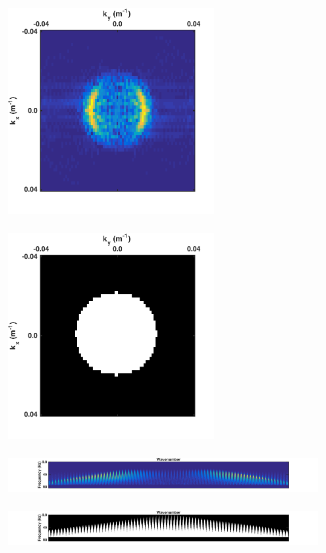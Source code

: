 \begin{figure}
	\centering
	\begin{subfigure}[t]{0.45\textwidth}
		\centering
		\includegraphics[width=0.6\textwidth]{Plots/FK-mask/FK-f_slice-data}
		\caption{}
		\label{fig:Ch-Theory-FK-f_slice-data}
	\end{subfigure}
	\centering
	\begin{subfigure}[t]{0.45\textwidth}
		\centering
		\includegraphics[width=0.6\textwidth]{Plots/FK-mask/FK-f_slice-mask}
		\caption{}
		\label{fig:Ch-Theory-FK-f_slice-mask}
	\end{subfigure}
	
	\begin{subfigure}[t]{\textwidth}
		\centering
		\includegraphics[width=0.9\textwidth]{Plots/FK-mask/FK-delphi-data}
		\caption{}
		\label{fig:Ch-Theory-FK-delphi-data}
	\end{subfigure}
	\par\bigskip
	\begin{subfigure}[t]{\textwidth}
		\centering
		\includegraphics[width=0.9\textwidth]{Plots/FK-mask/FK-delphi-mask}
		\caption{}
		\label{fig:Ch-Theory-FK-delphi-mask}
	\end{subfigure}
	

\end{figure}
